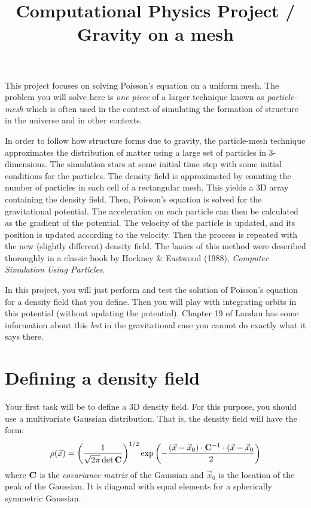 \documentclass[11pt, preprint]{aastex}
\begin{document}
\title{\bf Computational Physics Project / Gravity on a mesh}

This project focuses on solving Poisson's equation on a uniform mesh.
The problem you will solve here is {\it one piece} of a larger
technique known as {\it particle-mesh} which is often used in the
context of simulating the formation of structure in the universe and
in other contexts. 

In order to follow how structure forms due to gravity, the
particle-mesh technique approximates the distribution of matter using
a large set of particles in 3-dimensions. The simulation stars at some
initial time step with some initial conditions for the particles. The
density field is approximated by counting the number of particles in
each cell of a rectangular mesh. This yields a 3D array containing the
density field. Then, Poisson's equation is solved for the
gravitational potential. The acceleration on each particle can then be
calculated as the gradient of the potential. The velocity of the
particle is updated, and its position is updated according to the
velocity. Then the process is repeated with the new (slightly
different) density field. The basics of this method were described
thoroughly in a classic book by Hockney \& Eastwood (1988), {\it
  Computer Simulation Using Particles}. 

In this project, you will just perform and test the solution of
Poisson's equation for a density field that you define. Then you will
play with integrating orbits in this potential (without updating the
potential). Chapter 19 of Landau has some information about this {\it
  but} in the gravitational case you cannot do exactly what it says
there. 

\section{Defining a density field}

Your first task will be to define a 3D density field. For this
purpose, you should use a multivariate Gaussian distribution. That is,
the density field will have the form:
\begin{equation}
\rho(\vec{x}) = \left(\frac{1}{\sqrt{2\pi} \det{\bf C}}\right)^{1/2}
\exp\left(-\frac{(\vec{x}-\vec{x}_0)\cdot{\bf
    C}^{-1}\cdot(\vec{x}-\vec{x}_0}{2}\right)
\end{equation}
where ${\bf C}$ is the {\it covariance matrix} of the Gaussian and
$\vec{x}_0$ is the location of the peak of the Gaussian. It is
diagonal with equal elements for a spherically symmetric Gaussian.
\end{document}
